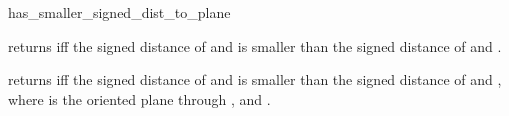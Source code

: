\begin{ccRefFunction}{has_smaller_signed_dist_to_plane}

          {returns  iff the signed distance of 
           and  is smaller than the signed distance of 
            and .}

          {returns  iff the signed distance of 
           and  is smaller than the signed distance of 
            and , where  is the oriented
           plane through ,  and .}
\end{ccRefFunction}

